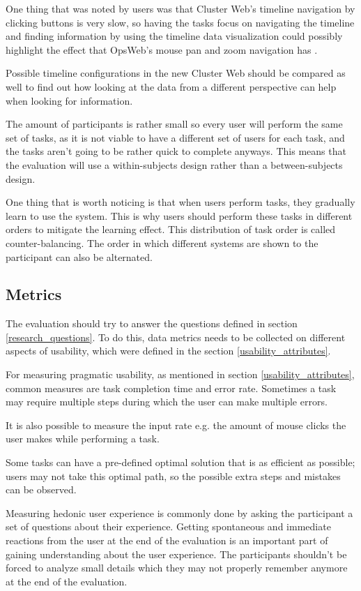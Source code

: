 One thing that was noted by users was that Cluster Web's timeline navigation by clicking buttons is very slow, so having the tasks focus on navigating the timeline and finding information by using the timeline data visualization could possibly highlight the effect that OpsWeb's mouse pan and zoom navigation has .

Possible timeline configurations in the new Cluster Web should be compared as well to find out how looking at the data from a different perspective can help when looking for information.

The amount of participants is rather small so every user will perform the same set of tasks, as it is not viable to have a different set of users for each task, and the tasks aren't going to be rather quick to complete anyways. This means that the evaluation will use a within-subjects design rather than a between-subjects design. 

One thing that is worth noticing is that when users perform tasks, they gradually learn to use the system. This is why users should perform these tasks in different orders to mitigate the learning effect. This distribution of task order is called counter-balancing. The order in which different systems are shown to the participant can also be alternated.
\cite{rubin2008handbook}

\subsection{Metrics}
The evaluation should try to answer the questions defined in section \ref{research_questions}. To do this, data metrics needs to be collected on different aspects of usability, which were defined in the section \ref{usability_attributes}.

For measuring pragmatic usability, as mentioned in section \ref{usability_attributes}, common measures are task completion time and error rate. Sometimes a task may require multiple steps during which the user can make multiple errors. 

It is also possible to measure the input rate e.g. the amount of mouse clicks the user makes while performing a task.

Some tasks can have a pre-defined optimal solution that is as efficient as possible; users may not take this optimal path, so the possible extra steps and mistakes can be observed. \cite{hornbaek2006current}

Measuring hedonic user experience is commonly done by asking the participant a set of questions about their experience. Getting spontaneous and immediate reactions from the user at the end of the evaluation is an important part of gaining understanding about the user experience. The participants shouldn't be forced to analyze small details which they may not properly remember anymore at the end of the evaluation. \cite{laugwitz2008construction}

